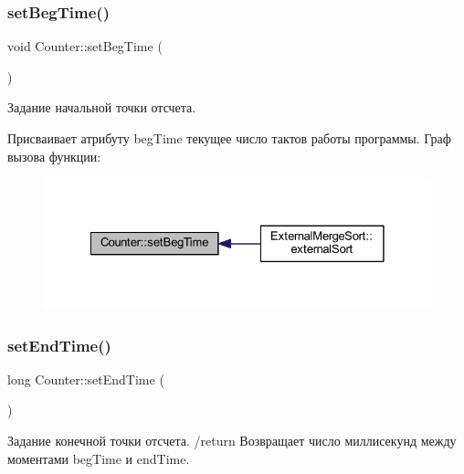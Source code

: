 \subsubsection{\texorpdfstring{set\+Beg\+Time()}{setBegTime()}}
{\footnotesize\ttfamily void Counter\+::set\+Beg\+Time (\begin{DoxyParamCaption}{ }\end{DoxyParamCaption})}



Задание начальной точки отсчета. 

Присваивает атрибуту beg\+Time текущее число тактов работы программы. Граф вызова функции\+:\nopagebreak
\begin{figure}[H]
\begin{center}
\leavevmode
\includegraphics[width=328pt]{class_counter_a71dea1262b81493aa9734f62a72b2691_icgraph}
\end{center}
\end{figure}
\hypertarget{class_counter_a338ac4f04d6f5924aa7ace3b14d9ffb9}{}\label{class_counter_a338ac4f04d6f5924aa7ace3b14d9ffb9} 
\subsubsection{\texorpdfstring{set\+End\+Time()}{setEndTime()}}
{\footnotesize\ttfamily long Counter\+::set\+End\+Time (\begin{DoxyParamCaption}{ }\end{DoxyParamCaption})}



Задание конечной точки отсчета. /return Возвращает число миллисекунд между моментами beg\+Time и end\+Time. 

